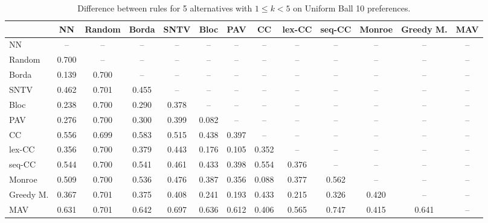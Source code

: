 
\begin{table*}[htbp]
\centering
\begin{tabular}{lcccccccccccc}
\toprule
 & NN & Random & Borda & SNTV & Bloc & PAV & CC & lex-CC & seq-CC & Monroe & Greedy M. & MAV \\
\midrule
NN & -- & -- & -- & -- & -- & -- & -- & -- & -- & -- & -- & -- \\
Random & \cellcolor{blue!70} 0.700 & -- & -- & -- & -- & -- & -- & -- & -- & -- & -- & -- \\
Borda & \cellcolor{blue!13} 0.139 & \cellcolor{blue!70} 0.700 & -- & -- & -- & -- & -- & -- & -- & -- & -- & -- \\
SNTV & \cellcolor{blue!46} 0.462 & \cellcolor{blue!70} 0.701 & \cellcolor{blue!45} 0.455 & -- & -- & -- & -- & -- & -- & -- & -- & -- \\
Bloc & \cellcolor{blue!23} 0.238 & \cellcolor{blue!70} 0.700 & \cellcolor{blue!28} 0.290 & \cellcolor{blue!37} 0.378 & -- & -- & -- & -- & -- & -- & -- & -- \\
PAV & \cellcolor{blue!27} 0.276 & \cellcolor{blue!70} 0.700 & \cellcolor{blue!30} 0.300 & \cellcolor{blue!39} 0.399 & \cellcolor{blue!8} 0.082 & -- & -- & -- & -- & -- & -- & -- \\
CC & \cellcolor{blue!55} 0.556 & \cellcolor{blue!69} 0.699 & \cellcolor{blue!58} 0.583 & \cellcolor{blue!51} 0.515 & \cellcolor{blue!43} 0.438 & \cellcolor{blue!39} 0.397 & -- & -- & -- & -- & -- & -- \\
lex-CC & \cellcolor{blue!35} 0.356 & \cellcolor{blue!70} 0.700 & \cellcolor{blue!37} 0.379 & \cellcolor{blue!44} 0.443 & \cellcolor{blue!17} 0.176 & \cellcolor{blue!10} 0.105 & \cellcolor{blue!35} 0.352 & -- & -- & -- & -- & -- \\
seq-CC & \cellcolor{blue!54} 0.544 & \cellcolor{blue!70} 0.700 & \cellcolor{blue!54} 0.541 & \cellcolor{blue!46} 0.461 & \cellcolor{blue!43} 0.433 & \cellcolor{blue!39} 0.398 & \cellcolor{blue!55} 0.554 & \cellcolor{blue!37} 0.376 & -- & -- & -- & -- \\
Monroe & \cellcolor{blue!50} 0.509 & \cellcolor{blue!70} 0.700 & \cellcolor{blue!53} 0.536 & \cellcolor{blue!47} 0.476 & \cellcolor{blue!38} 0.387 & \cellcolor{blue!35} 0.356 & \cellcolor{blue!8} 0.088 & \cellcolor{blue!37} 0.377 & \cellcolor{blue!56} 0.562 & -- & -- & -- \\
Greedy M. & \cellcolor{blue!36} 0.367 & \cellcolor{blue!70} 0.701 & \cellcolor{blue!37} 0.375 & \cellcolor{blue!40} 0.408 & \cellcolor{blue!24} 0.241 & \cellcolor{blue!19} 0.193 & \cellcolor{blue!43} 0.433 & \cellcolor{blue!21} 0.215 & \cellcolor{blue!32} 0.326 & \cellcolor{blue!42} 0.420 & -- & -- \\
MAV & \cellcolor{blue!63} 0.631 & \cellcolor{blue!70} 0.701 & \cellcolor{blue!64} 0.642 & \cellcolor{blue!69} 0.697 & \cellcolor{blue!63} 0.636 & \cellcolor{blue!61} 0.612 & \cellcolor{blue!40} 0.406 & \cellcolor{blue!56} 0.565 & \cellcolor{blue!74} 0.747 & \cellcolor{blue!41} 0.415 & \cellcolor{blue!64} 0.641 & -- \\
\bottomrule
\end{tabular}

\caption{Difference between rules for 5 alternatives with $1 \leq k < 5$ on Uniform Ball 10 preferences.}
\label{tab:rule_distance_heatmap-m=[5]-pref_dist=euclidean__args__dimensions=10_-_space=uniform_ball}
\end{table*}
    